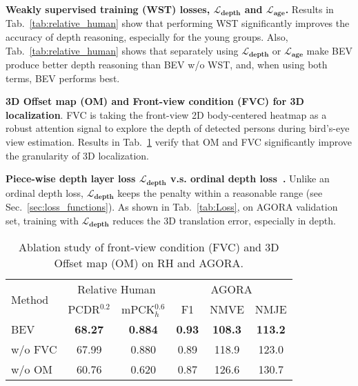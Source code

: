 \documentclass[10pt,twocolumn,letterpaper]{article}
\begin{document}
\textbf{Weakly supervised training (WST) losses, $\boldsymbol{\mathcal{L}_{depth}}$ and $\boldsymbol{\mathcal{L}_{age}}$.}
Results in Tab.~\ref{tab:relative_human} show that performing WST significantly improves the accuracy of depth reasoning, especially for the young groups.
Also, Tab.~\ref{tab:relative_human} shows that separately using $\boldsymbol{\mathcal{L}_{depth}}$ or $\boldsymbol{\mathcal{L}_{age}}$ make BEV produce better depth reasoning than BEV w/o WST, and, when using both terms, BEV performs best.


\textbf{3D Offset map (OM) and Front-view condition (FVC) for 3D localization}. 
FVC is taking the front-view 2D body-centered heatmap as a robust attention signal to explore the depth of detected persons during bird's-eye view estimation. 
Results in Tab.~\ref{tab:ablation_study} verify that OM and FVC significantly improve the granularity of 3D localization. 




\textbf{Piece-wise depth layer loss $\boldsymbol{\mathcal{L}_{depth}}$ v.s. ordinal depth loss~\cite{wang2020hmor}.}
Unlike an ordinal depth loss, $\boldsymbol{\mathcal{L}_{depth}}$ keeps the penalty within a reasonable range (see Sec.~\ref{sec:loss_functions}).
As shown in Tab.~\ref{tab:Loss}, on AGORA validation set, training with $\boldsymbol{\mathcal{L}_{depth}}$ reduces the 3D translation error, especially in depth.


\begin{table}[t]
\footnotesize
\centering
	\begin{tabular}{l|cc|ccc}
	\toprule
	\multirow{2}{*}{ Method}  &  \multicolumn{2}{c|}{ Relative Human} & \multicolumn{3}{c}{ AGORA} \\
	\cline{2-6}
	& \multicolumn{1}{c}{PCDR$^{0.2}$} & \multicolumn{1}{c|}{mPCK$_{h}^{0.6}$} & \multicolumn{1}{c}{ F1} & \multicolumn{1}{c}{ NMVE} & \multicolumn{1}{c}{ NMJE} \\
    \midrule
    BEV & \textbf{68.27} & \textbf{0.884} & \textbf{0.93} & \textbf{108.3} & \textbf{113.2}\\ 
    { w/o FVC} & 67.99 & 0.880 & 0.89 & 118.9 & 123.0 \\
    { w/o OM} & 60.76 & 0.620 & 0.87 & 126.6 & 130.7 \\
	\bottomrule
    \end{tabular}
    \vspace{-2mm}
    \caption{Ablation study of front-view condition (FVC) and 3D Offset map (OM) on RH and AGORA.}\vspace{-2mm}
    \label{tab:ablation_study}
\end{table}
\end{document}
